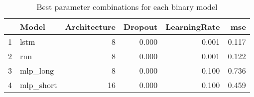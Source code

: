 \begin{table}[ht]
\centering
\begin{tabular}{rlrrrr}
  \hline
 & Model & Architecture & Dropout & LearningRate & mse \\ 
  \hline
1 & lstm &    8 & 0.000 & 0.001 & 0.117 \\ 
  2 & rnn &    8 & 0.000 & 0.001 & 0.122 \\ 
  3 & mlp\_long &    8 & 0.000 & 0.100 & 0.736 \\ 
  4 & mlp\_short &   16 & 0.000 & 0.100 & 0.459 \\ 
   \hline
\end{tabular}
\caption{Best parameter combinations for each binary model} 
\label{tab:best_models}
\end{table}
